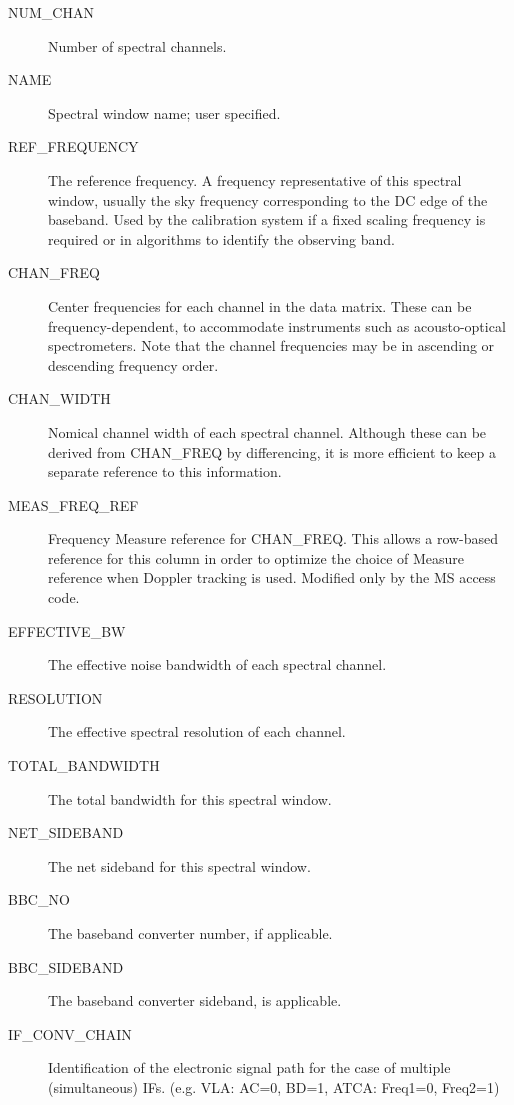 \documentclass{article}
\begin{document}
\begin{description}
\item[NUM\_CHAN] Number of spectral channels.

\item[NAME] Spectral window name; user specified.

\item[REF\_FREQUENCY] The reference frequency. A frequency
representative of this spectral window, usually the sky frequency
corresponding to the DC edge of the baseband. Used by the calibration
system if a fixed scaling frequency is required or in algorithms to
identify the observing band.

\item[CHAN\_FREQ] Center frequencies for each channel in the data
matrix. These can be frequency-dependent, to accommodate instruments
such as acousto-optical spectrometers. Note that the channel
frequencies may be in ascending or descending frequency order.

\item[CHAN\_WIDTH] Nomical channel width of each spectral
channel. Although these can be derived from CHAN\_FREQ by
differencing, it is more efficient to keep a separate reference to
this information.

\item[MEAS\_FREQ\_REF] Frequency Measure reference for
CHAN\_FREQ. This allows a row-based reference for this column in order to
optimize the choice of Measure reference when Doppler tracking is
used. Modified only by the MS access code.

\item[EFFECTIVE\_BW] The effective noise bandwidth of each spectral channel.

\item[RESOLUTION] The effective spectral resolution of each channel.

\item[TOTAL\_BANDWIDTH] The total bandwidth for this spectral window.

\item[NET\_SIDEBAND] The net sideband for this spectral window.

\item[BBC\_NO] The baseband converter number, if applicable.

\item[BBC\_SIDEBAND] The baseband converter sideband, is applicable.

\item[IF\_CONV\_CHAIN] Identification of the electronic signal
path for the case of multiple (simultaneous) IFs. (e.g. VLA: AC=0,
BD=1, ATCA: Freq1=0, Freq2=1)


\end{description}
\end{document}
